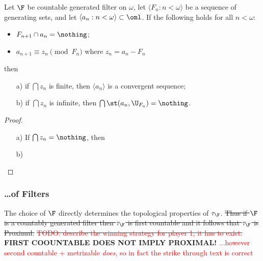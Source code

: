 \documentclass{article}
\begin{document}
\begin{lem}
    Let \(\F\) be countable generated filter on \(\omega\), let \(\langle F_n : n < \omega\rangle\) be a sequence of generating sets, and let \(\langle a_n : n < \omega\rangle \subset \oml\). If the following holds for all \(n < \omega\):
    \begin{itemize}
        \item \(F_{n + 1} \cap a_n = \nothing\);
        \item \(a_{n + 1} \equiv z_n \pmod {F_n}\) where \(z_n = a_n - F_n\)
    \end{itemize}
    then 
    \begin{enumerate}
        \item[a)] if \(\bigcap z_n\) is finite, then \(\langle a_n \rangle\) is a convergent sequence;
        \item[b)] if \(\bigcap z_n\) is infinite, then \(\bigcap \st(a_n, \U_{F_n}) = \nothing\).
    \end{enumerate}
\end{lem}
\begin{proof}
    \leavevmode
    \begin{enumerate}
        \item[a)] If \(\bigcap z_n = \nothing\), then
        \item[b)] 
    \end{enumerate}
\end{proof}
\subsubsection*{\dots of Filters}
The choice of \(\F\) directly determines the topological properties of \(\tau_{\F}\). \sout{Thus if \(\F\) is a countably generated filter then \(\tau_{\F}\) is first countable and it follows that \(\tau_{\F}\) is Proximal.} \textcolor{red}{\sout{TODO: describe the winning strategy for player 1, it has to exist.}} \textbf{FIRST COOUNTABLE DOES NOT IMPLY PROXIMAL!}
\textcolor{red}{...however second countable + metrizable \textit{does}, so in fact the strike through text is correct}

\end{document}
